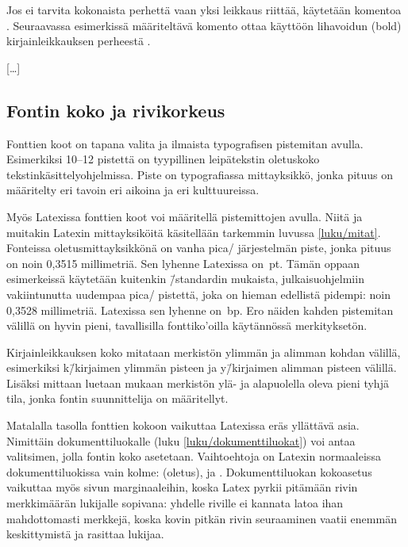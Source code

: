 Jos ei tarvita kokonaista perhettä vaan yksi leikkaus riittää, käytetään
komentoa . Seuraavassa esimerkissä määriteltävä
komento  ottaa käyttöön lihavoidun (bold)
kirjainleikkauksen perheestä .

\begin{koodilohkosis}
[…]
\end{koodilohkosis}

\subsection{Fontin koko ja rivikorkeus}

Fonttien koot on tapana valita ja ilmaista typografisen pistemitan
avulla. Esimerkiksi 10--12 pistettä on tyypillinen leipätekstin
oletuskoko tekstinkäsittelyohjelmissa. Piste on typografiassa
mittayksikkö, jonka pituus on määritelty eri tavoin eri aikoina ja eri
kulttuureissa.

Myös Latexissa fonttien koot voi määritellä pistemittojen avulla. Niitä
ja muitakin Latexin mittayksiköitä käsitellään tarkemmin luvussa
\ref{luku/mitat}. Fonteissa oletusmittayksikkönä on vanha pica\-/
järjestelmän piste, jonka pituus on noin 0,3515 millimetriä. Sen lyhenne
Latexissa on~pt. Tämän oppaan esimerkeissä käytetään kuitenkin
 \=/standardin mukaista, julkaisuohjelmiin
vakiintunutta uudempaa pica\-/ pistettä, joka on hieman edellistä
pidempi: noin 0,3528 millimetriä. Latexissa sen lyhenne on~bp. Ero
näiden kahden pistemitan välillä on hyvin pieni, tavallisilla
fonttiko'oilla käytännössä merkityksetön.

Kirjainleikkauksen koko mitataan merkistön ylimmän ja alimman kohdan
välillä, esimerkiksi k\=/kirjaimen ylimmän pisteen ja y\=/kirjaimen
alimman pisteen välillä. Lisäksi mittaan luetaan mukaan merkistön ylä-
ja alapuolella oleva pieni tyhjä tila, jonka fontin suunnittelija on
määritellyt.

Matalalla tasolla fonttien kokoon vaikuttaa Latexissa eräs yllättävä
asia. Nimittäin dokumenttiluokalle (luku \ref{luku/dokumenttiluokat})
voi antaa valitsimen, jolla fontin koko asetetaan. Vaihtoehtoja on
Latexin normaaleissa dokumenttiluokissa vain kolme: \koodi{10pt}
(oletus), \koodi{11pt} ja \koodi{12pt}. Dokumenttiluokan kokoasetus
vaikuttaa myös sivun marginaaleihin, koska Latex pyrkii pitämään rivin
merkkimäärän lukijalle sopivana: yhdelle riville ei kannata latoa ihan
mahdottomasti merkkejä, koska kovin pitkän rivin seuraaminen vaatii
enemmän keskittymistä ja rasittaa lukijaa.

